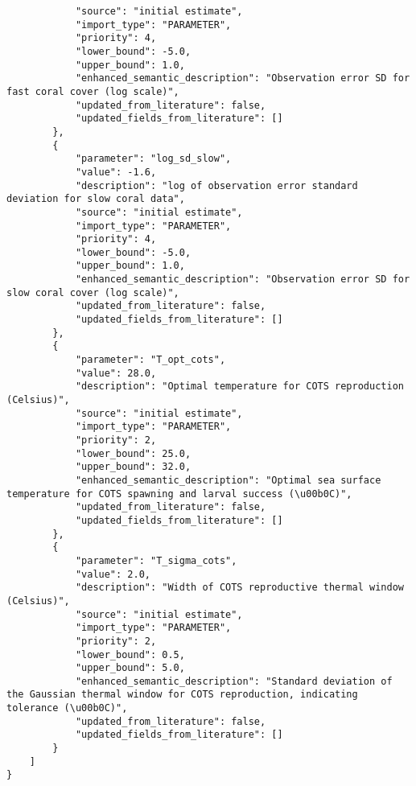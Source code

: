 \begin{lstlisting}
            "source": "initial estimate",
            "import_type": "PARAMETER",
            "priority": 4,
            "lower_bound": -5.0,
            "upper_bound": 1.0,
            "enhanced_semantic_description": "Observation error SD for fast coral cover (log scale)",
            "updated_from_literature": false,
            "updated_fields_from_literature": []
        },
        {
            "parameter": "log_sd_slow",
            "value": -1.6,
            "description": "log of observation error standard deviation for slow coral data",
            "source": "initial estimate",
            "import_type": "PARAMETER",
            "priority": 4,
            "lower_bound": -5.0,
            "upper_bound": 1.0,
            "enhanced_semantic_description": "Observation error SD for slow coral cover (log scale)",
            "updated_from_literature": false,
            "updated_fields_from_literature": []
        },
        {
            "parameter": "T_opt_cots",
            "value": 28.0,
            "description": "Optimal temperature for COTS reproduction (Celsius)",
            "source": "initial estimate",
            "import_type": "PARAMETER",
            "priority": 2,
            "lower_bound": 25.0,
            "upper_bound": 32.0,
            "enhanced_semantic_description": "Optimal sea surface temperature for COTS spawning and larval success (\u00b0C)",
            "updated_from_literature": false,
            "updated_fields_from_literature": []
        },
        {
            "parameter": "T_sigma_cots",
            "value": 2.0,
            "description": "Width of COTS reproductive thermal window (Celsius)",
            "source": "initial estimate",
            "import_type": "PARAMETER",
            "priority": 2,
            "lower_bound": 0.5,
            "upper_bound": 5.0,
            "enhanced_semantic_description": "Standard deviation of the Gaussian thermal window for COTS reproduction, indicating tolerance (\u00b0C)",
            "updated_from_literature": false,
            "updated_fields_from_literature": []
        }
    ]
}
\end{lstlisting}
